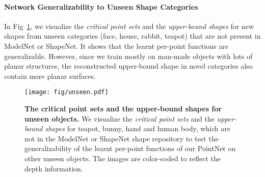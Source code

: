 \documentclass[10pt,twocolumn,letterpaper]{article}
\begin{document}
\begin{comment}
In Sec 5.2 \textit{3D Object Part Segmentation}, we apply our proposed PointNet on segmenting the CAD models into semantic parts. While our segmentation PointNet (illustrated in Fig. 2, \textit{Segmentation Network}) achieves the state-of-the-art result on complete ShapeNet shapes, it performs reasonably well on partial data (e.g. simulated Kinect scans) as well. Since most real world scans are very partial due to occlusions, a model's robustness to partial input is key to evaluate its value in practice. Table~\ref{tab:segmentation_partial} summarizes the performance of our PointNet and the proposed baseline 3D CNN method when being applied to complete and partial data.

\begin{table}[h!]
    \small
    \centering
    \begin{tabular}[width=\linewidth]{l|cccc}
    \hline
    ~ & complete input & partial input \\ \hline
    3D CNN & 75.3 & 69.7 \\ \hline
    Ours PointNet & \textbf{80.6} & \textbf{75.3}  \\ \hline
    \end{tabular}
    \caption{\textbf{Segmentation results on partial scans.} Metric is mean IoU across all shapes. We perform rotation augmentation when training our PointNet on complete data to fairly compare with the simulated Kinect scans, that are generated from multiple perspective. Both networks are trained respectively on the complete data and the partial data and then tested on the testing splits.}
    \label{tab:segmentation_partial}
\end{table}
\end{comment}


\paragraph{Network Generalizability to Unseen Shape Categories}
In Fig~\ref{fig:unseen}, we visualize the \textit{critical point sets} and the \textit{upper-bound shapes} for new shapes from unseen categories (face, house, rabbit, teapot) that are not present in ModelNet or ShapeNet. It shows that the learnt per-point functions are generalizable. However, since we train mostly on man-made objects with lots of planar structures, the reconstructed upper-bound shape in novel categories also contain more planar surfaces. 
 
\begin{figure}[t!]
\centering
\texttt{[image: fig/unseen.pdf]}
\caption{\textbf{The critical point sets and the upper-bound shapes for unseen objects.} We visualize the \textit{critical point sets} and the \textit{upper-bound shapes} for teapot, bunny, hand and human body, which are not in the ModelNet or ShapeNet shape repository to test the generalizability of the learnt per-point functions of our PointNet on other unseen objects. The images are color-coded to reflect the depth information.}
\label{fig:unseen}
\end{figure}
\end{document}
